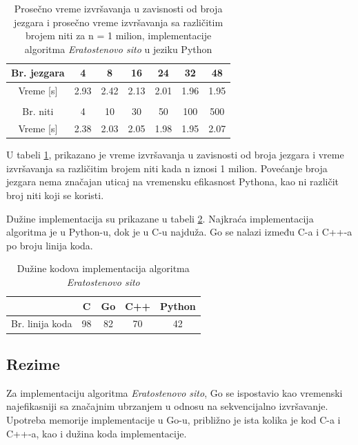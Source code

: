 \documentclass[12pt,oneside]{memoir}
\begin{document}
\begin{table}[H]
\begin{center}
\caption{Prosečno vreme izvršavanja  u zavisnosti od broja jezgara i prosečno vreme izvršavanja sa različitim brojem niti za n = 1 milion, implementacije algoritma \textit{Eratostenovo sito} u jeziku Python}
\begin{tabular}{||c||c|c|c|c|c|c||}
\hline
Br. jezgara &4  &8 &16 &24 & 32 &48 \\ \hline
Vreme [s]	&2.93		&2.42		&2.13 	& 2.01	&1.96 	&1.95\\ \hline  
\multicolumn{7}{c}{}\\
\hline
Br. niti &4 &10 &30 &50 &100 & 500  \\ \hline
Vreme [s]	&2.38		&2.03		&2.05	 	& 1.98	&1.95		&2.07\\ \hline
\end{tabular}
\label{tab:prime11}
\end{center}
\end{table}

U  tabeli \ref{tab:prime11}, prikazano je vreme izvršavanja u zavisnosti od broja jezgara i vreme izvršavanja sa različitim brojem niti kada n iznosi 1 milion. Povećanje broja jezgara nema značajan uticaj na vremensku efikasnost Pythona, kao ni različit broj niti koji se koristi.

Dužine implementacija su prikazane u tabeli \ref{tab:prime2}. Najkraća implementacija algoritma je u Python-u, dok je u C-u najduža. Go se nalazi između C-a i C++-a po broju linija koda.

\begin{table}[H]
\begin{center}
\caption{Dužine kodova implementacija algoritma \textit{Eratostenovo sito}}
\begin{tabular}{|c|c|c|c|c|}
\hline
		&  C  		&Go 	& C++ & Python 	 \\ \hline
Br. linija koda&98		& 82	&70	&42		 \\ \hline
\end{tabular}
\label{tab:prime2}
\end{center}
\end{table}


\subsection{Rezime}

Za implementaciju algoritma \textit{Eratostenovo sito},  Go se ispostavio kao vremenski najefikasniji sa značajnim ubrzanjem u odnosu na sekvencijalno izvršavanje. Upotreba memorije implementacije u Go-u, približno je ista kolika je kod C-a i C++-a, kao i dužina koda implementacije.
\end{document}
